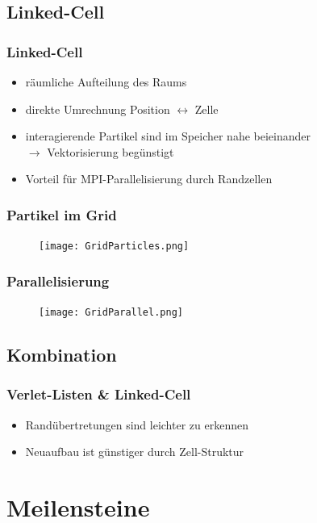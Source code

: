 \documentclass[compress]{beamer}
\begin{document}
\subsection{Linked-Cell}
\begin{frame}%
	\frametitle{Linked-Cell}
	\begin{itemize}
		\item räumliche Aufteilung des Raums
        \item direkte Umrechnung Position $\leftrightarrow$ Zelle
        \item interagierende Partikel sind im Speicher nahe beieinander \\
        $\rightarrow$ Vektorisierung begünstigt
        \item Vorteil für MPI-Parallelisierung durch Randzellen
	\end{itemize}
\end{frame}
\begin{frame}%
	\frametitle{Partikel im Grid}
    \begin{figure}
		\begin{center}
			\texttt{[image: GridParticles.png]}
		\end{center}
	\end{figure}
\end{frame}
\begin{frame}%
	\frametitle{Parallelisierung}
    \begin{figure}
		\begin{center}
			\texttt{[image: GridParallel.png]}
		\end{center}
	\end{figure}
\end{frame}
\subsection{Kombination}
\begin{frame}%
	\frametitle{Verlet-Listen \& Linked-Cell}
	\begin{itemize}
		\item Randübertretungen sind leichter zu erkennen
        \item Neuaufbau ist günstiger durch Zell-Struktur
	\end{itemize}
\end{frame}
\section{Meilensteine}
\end{document}
